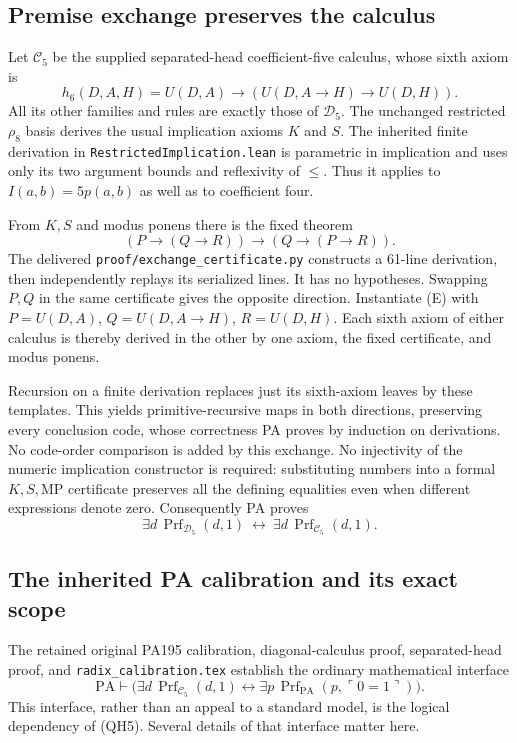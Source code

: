 \subsection{Premise exchange preserves the calculus}

Let $\mathcal C_5$ be the supplied separated-head coefficient-five calculus,
whose sixth axiom is
\[
 h_6(D,A,H)=U(D,A)\to(U(D,A\to H)\to U(D,H)).
\]
All its other families and rules are exactly those of $\mathcal D_5$.
The unchanged restricted $\rho_8$ basis derives the usual implication
axioms $K$ and $S$. The inherited finite derivation in
\texttt{RestrictedImplication.lean} is parametric in implication and uses
only its two argument bounds and reflexivity of $\leq$. Thus it applies
to $I(a,b)=5p(a,b)$ as well as to coefficient four.

From $K,S$ and modus ponens there is the fixed theorem
\[
 (P\to(Q\to R))\to(Q\to(P\to R)).               \tag{E}
\]
The delivered \texttt{proof/exchange\_certificate.py} constructs a
61-line derivation, then independently replays its serialized lines.
It has no hypotheses. Swapping $P,Q$ in the same certificate gives the
opposite direction. Instantiate (E) with
$P=U(D,A)$, $Q=U(D,A\to H)$, $R=U(D,H)$. Each sixth axiom of either
calculus is thereby derived in the other by one axiom, the fixed
certificate, and modus ponens.

Recursion on a finite derivation replaces just its sixth-axiom leaves
by these templates. This yields primitive-recursive maps in both
directions, preserving every conclusion code, whose correctness PA
proves by induction on derivations. No code-order comparison is added
by this exchange. No injectivity of the numeric implication constructor
is required: substituting numbers into a formal $K,S,\mathrm{MP}$
certificate preserves all the defining equalities even when different
expressions denote zero. Consequently PA proves
\[
 \exists d\,\operatorname{Prf}_{\mathcal D_5}(d,1)
 \ \leftrightarrow\
 \exists d\,\operatorname{Prf}_{\mathcal C_5}(d,1).       \tag{1}
\]

\subsection{The inherited PA calibration and its exact scope}

The retained original PA195 calibration, diagonal-calculus proof,
separated-head proof, and \texttt{radix\_calibration.tex} establish the
ordinary mathematical interface
\[
 \mathrm{PA}\vdash
 \bigl(\exists d\,\operatorname{Prf}_{\mathcal C_5}(d,1)
 \leftrightarrow
 \exists p\,\operatorname{Prf}_{\mathrm{PA}}(p,\ulcorner0=1\urcorner)
 \bigr).                                                \tag{2}
\]
This interface, rather than an appeal to a standard model, is the logical
dependency of (QH5). Several details of that interface matter here.

